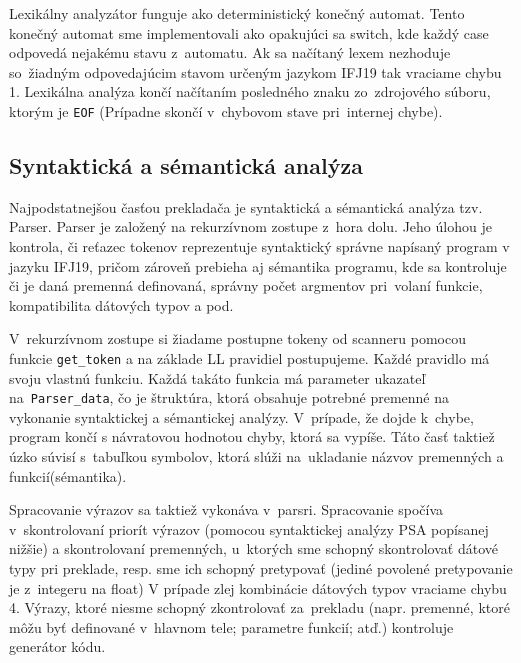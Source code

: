 \documentclass[a4paper, 11pt]{article}
\begin{document}
    Lexikálny analyzátor funguje ako deterministický konečný automat. Tento konečný automat sme implementovali ako opakujúci sa switch, kde každý case odpovedá nejakému stavu z~automatu. Ak sa načítaný lexem nezhoduje so~žiadným odpovedajúcim stavom určeným jazykom IFJ19 tak vraciame chybu 1. Lexikálna analýza končí načítaním posledného znaku zo~zdrojového súboru, ktorým je \texttt{EOF} (Prípadne skončí v~chybovom stave pri~internej chybe). 

        
    \pagebreak    
        
    \subsection{Syntaktická a sémantická analýza}
    
    Najpodstatnejšou časťou prekladača je syntaktická a sémantická analýza tzv. Parser. Parser je založený na rekurzívnom zostupe z~hora dolu. Jeho úlohou je kontrola, či reťazec tokenov reprezentuje syntaktický správne napísaný program v jazyku IFJ19, pričom zároveň prebieha aj sémantika programu, kde sa kontroluje či je daná premenná definovaná, správny počet argmentov pri~volaní funkcie, kompatibilita dátových typov a pod.

    V~rekurzívnom zostupe si žiadame postupne tokeny od scanneru pomocou funkcie \texttt{get\_token} a na základe LL pravidiel postupujeme. Každé pravidlo má svoju vlastnú funkciu. Každá takáto funkcia má parameter ukazateľ na~\texttt{Parser\_data}, čo je štruktúra, ktorá obsahuje potrebné premenné na vykonanie syntaktickej a sémantickej analýzy. V~prípade, že dojde k~chybe, program končí s návratovou hodnotou chyby, ktorá sa vypíše. Táto časť taktiež úzko súvisí s~tabuľkou symbolov, ktorá slúži na~ukladanie názvov premenných a funkcií(sémantika).

    Spracovanie výrazov sa taktiež vykonáva v~parsri. Spracovanie spočíva v~skontrolovaní priorít výrazov (pomocou syntaktickej analýzy PSA popísanej nižšie) a skontrolovaní premenných, u~ktorých sme schopný skontrolovať dátové typy pri preklade, resp. sme ich schopný pretypovať (jediné povolené pretypovanie je z~integeru na float) V prípade zlej kombinácie dátových typov vraciame chybu 4. Výrazy, ktoré niesme schopný zkontrolovať za~prekladu (napr. premenné, ktoré môžu byť definované v~hlavnom tele; parametre funkcií; atď.) kontroluje generátor kódu.
        
\end{document}
